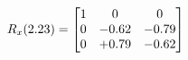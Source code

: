 \documentclass[preview]{standalone}
\begin{document}
\begin{align*}
\special{dvisvgm:raw <g id='unique000'>}R_{x}(2.23) = \begin{bmatrix}1 & 0 & 0 \\0 & -0.62 & -0.79 \\0 & +0.79 & -0.62\end{bmatrix}\special{dvisvgm:raw </g>}
\end{align*}
\end{document}
